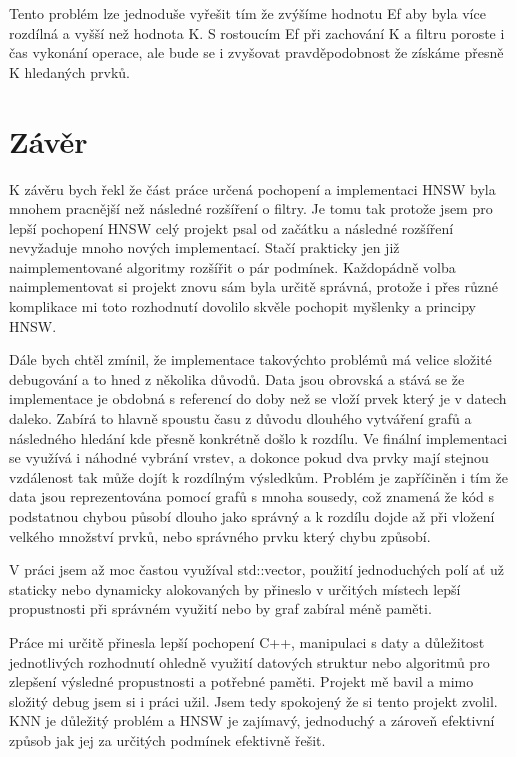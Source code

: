 \documentclass[czech,semestral,dept460,male,csharp,cpdeclaration]{diploma}
\begin{document}
			Tento problém lze jednoduše vyřešit tím že zvýšíme hodnotu Ef aby byla více rozdílná a vyšší než hodnota K. S rostoucím Ef při zachování K a filtru poroste i čas vykonání operace, ale bude se i zvyšovat pravděpodobnost že získáme přesně K hledaných prvků.
	
	\chapter{Závěr}
	\label{chap_zaver}
	
		K závěru bych řekl že část práce určená pochopení a implementaci HNSW byla mnohem pracnější než následné rozšíření o filtry. Je tomu tak protože jsem pro lepší pochopení HNSW celý projekt psal od začátku a následné rozšíření nevyžaduje mnoho nových implementací. Stačí prakticky jen již naimplementované algoritmy rozšířit o pár podmínek. Každopádně volba naimplementovat si projekt znovu sám byla určitě správná, protože i přes různé komplikace mi toto rozhodnutí dovolilo skvěle pochopit myšlenky a principy HNSW.
		
		Dále bych chtěl zmínil, že implementace takovýchto problémů má velice složité debugování a to hned z několika důvodů. Data jsou obrovská a stává se že implementace je obdobná s referencí do doby než se vloží prvek který je v datech daleko. Zabírá to hlavně spoustu času z důvodu dlouhého vytváření grafů a následného hledání kde přesně konkrétně došlo k rozdílu. Ve finální implementaci se využívá i náhodné vybrání vrstev, a dokonce pokud dva prvky mají stejnou vzdálenost tak může dojít k rozdílným výsledkům. Problém je zapříčiněn i tím že data jsou reprezentována pomocí grafů s mnoha sousedy, což znamená že kód s podstatnou chybou působí dlouho jako správný a k rozdílu dojde až při vložení velkého množství prvků, nebo správného prvku který chybu způsobí.
		
		V práci jsem až moc častou využíval std::vector, použití jednoduchých polí ať už staticky nebo dynamicky alokovaných by přineslo v určitých místech lepší propustnosti při správném využití nebo by graf zabíral méně paměti.
		
		Práce mi určitě přinesla lepší pochopení C++, manipulaci s daty a důležitost jednotlivých rozhodnutí ohledně využití datových struktur nebo algoritmů pro zlepšení výsledné propustnosti a potřebné paměti. Projekt mě bavil a mimo složitý debug jsem si i práci užil. Jsem tedy spokojený že si tento projekt zvolil. KNN je důležitý problém a HNSW je zajímavý, jednoduchý a zároveň efektivní způsob jak jej za určitých podmínek efektivně řešit.
	
	\nocite{*}
	
	\printbibliography[title={Literatura}, heading=bibintoc]
	
\end{document}
